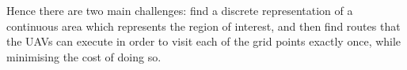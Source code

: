 Hence there are two main challenges: find a discrete representation of a continuous area which represents the region of interest, and then find routes that the UAVs can execute in order to visit each of the grid points exactly once, while minimising the cost of doing so.










